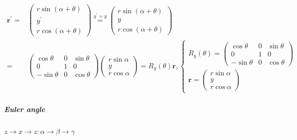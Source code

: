 \documentclass[
]{book}
\theoremstyle{definition}
\theoremstyle{definition}
\theoremstyle{definition}
\theoremstyle{definition}
\theoremstyle{remark}
\begin{document}
\[
\begin{aligned}
\boldsymbol{r}^{\prime}= & \begin{pmatrix}r\sin\left(\alpha+\theta\right)\\
y^{\prime}\\
r\cos\left(\alpha+\theta\right)
\end{pmatrix}\overset{y^{\prime}=y}{=}\begin{pmatrix}r\sin\left(\alpha+\theta\right)\\
y\\
r\cos\left(\alpha+\theta\right)
\end{pmatrix}\\
= & \begin{pmatrix}\cos\theta & 0 & \sin\theta\\
0 & 1 & 0\\
-\sin\theta & 0 & \cos\theta
\end{pmatrix}\begin{pmatrix}r\sin\alpha\\
y\\
r\cos\alpha
\end{pmatrix}=R_{{\scriptscriptstyle y}}\left(\theta\right)\boldsymbol{r},\begin{cases}
R_{{\scriptscriptstyle y}}\left(\theta\right)=\begin{pmatrix}\cos\theta & 0 & \sin\theta\\
0 & 1 & 0\\
-\sin\theta & 0 & \cos\theta
\end{pmatrix}\\
\boldsymbol{r}=\begin{pmatrix}r\sin\alpha\\
y\\
r\cos\alpha
\end{pmatrix}
\end{cases}
\end{aligned}
\]

\subparagraph{Euler angle}\label{euler-angle}

\(z\rightarrow x\rightarrow z:\alpha\rightarrow\beta\rightarrow\gamma\)
\end{document}
